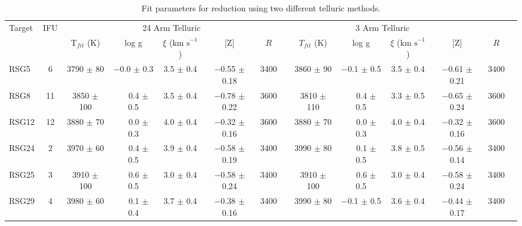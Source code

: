 \documentclass[manuscript]{aastex}
\def\kms{$\mbox{km s}^{-1}$}
\def\pp{$\phantom{-}$}
\def\o{$\phantom{0}$}
\begin{document}
\begin{table*}
\begin{center}
\caption{
Fit parameters for reduction using two different telluric methods.
         }
\scriptsize
\label{tab:stellar_params}
\begin{tabular}{lcccccc c cccccc}
 \hline
  Target  & IFU &  \multicolumn{5}{c}{24 Arm Telluric} & \multicolumn{5}{c}{3 Arm Telluric}\\
  \cline{3-7} \cline{9-13}
 &  & T$_{fit}$ (K) & log g & $\xi$ (\kms) & [Z] &$R$ & & $T_{fit}$ (K) & log g & $\xi$ (\kms) & [Z] & $R$\\
  \hline
RSG5  & 6 & 3790 $\pm$ 80\o & $-$0.0 $\pm$ 0.3 & 3.5 $\pm$ 0.4 & $-$0.55 $\pm$ 0.18 & 3400 & & 3860 $\pm$ 90\o & $-$0.1 $\pm$ 0.5 &  3.5 $\pm$ 0.4 & $-$0.61 $\pm$ 0.21 & 3400 \\
RSG8  & 11& 3850 $\pm$ 100  & \pp0.4 $\pm$ 0.5 & 3.5 $\pm$ 0.4 & $-$0.78 $\pm$ 0.22 & 3600 & & 3810 $\pm$ 110  & \pp0.4 $\pm$ 0.5 &  3.3 $\pm$ 0.5 & $-$0.65 $\pm$ 0.24 & 3600 \\
RSG12 & 12& 3880 $\pm$ 70\o & \pp0.0 $\pm$ 0.3 & 4.0 $\pm$ 0.4 & $-$0.32 $\pm$ 0.16 & 3600 & & 3880 $\pm$ 70\o & \pp0.0 $\pm$ 0.3 &  4.0 $\pm$ 0.4 & $-$0.32 $\pm$ 0.16 & 3600 \\
RSG24 & 2 & 3970 $\pm$ 60\o & \pp0.4 $\pm$ 0.5 & 3.9 $\pm$ 0.4 & $-$0.58 $\pm$ 0.19 & 3400 & & 3990 $\pm$ 80\o & \pp0.1 $\pm$ 0.5 &  3.8 $\pm$ 0.5 & $-$0.56 $\pm$ 0.14 & 3400 \\
RSG25 & 3 & 3910 $\pm$ 100  & \pp0.6 $\pm$ 0.5 & 3.0 $\pm$ 0.4 & $-$0.58 $\pm$ 0.24 & 3400 & & 3910 $\pm$ 100  & \pp0.6 $\pm$ 0.5 &  3.0 $\pm$ 0.4 & $-$0.58 $\pm$ 0.24 & 3400 \\
RSG29 & 4 & 3980 $\pm$ 60\o & \pp0.1 $\pm$ 0.4 & 3.7 $\pm$ 0.4 & $-$0.38 $\pm$ 0.16 & 3400 & & 3990 $\pm$ 80\o & $-$0.1 $\pm$ 0.5 &  3.6 $\pm$ 0.4 & $-$0.44 $\pm$ 0.17 & 3400 \\

\end{tabular}
\end{center}
\end{table*}
\end{document}
